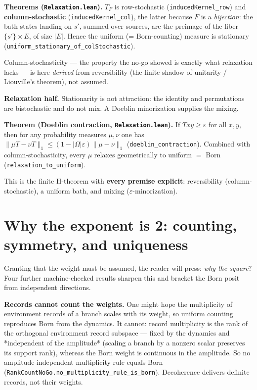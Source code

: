 \documentclass[11pt,a4paper]{article}
\newenvironment{qiqtquote}{\begin{mdframed}[style=quotestyle]}{\end{mdframed}}
\begin{document}
\begin{qiqtquote}
\textbf{Theorems (\texttt{Relaxation.lean}).} $T_F$ is row-stochastic (\texttt{inducedKernel\_row}) and \textbf{column-stochastic}
(\texttt{inducedKernel\_col}), the latter because $F$ is a \emph{bijection}: the bath states landing on $s'$, summed
over sources, are the preimage of the fiber $\{s'\}\times E$, of size $\lvert E\rvert$. Hence the uniform
(= Born-counting) measure is stationary (\texttt{uniform\_stationary\_of\_colStochastic}).
\end{qiqtquote}

Column-stochasticity — the property the no-go showed is exactly what relaxation lacks — is here \emph{derived}
from reversibility (the finite shadow of unitarity / Liouville's theorem), not assumed.

\textbf{Relaxation half.} Stationarity is not attraction: the identity and permutations are bistochastic and do
not mix. A Doeblin minorization supplies the mixing.

\begin{qiqtquote}
\textbf{Theorem (Doeblin contraction, \texttt{Relaxation.lean}).} If $T x y\ge\varepsilon$ for all $x,y$, then for any
probability measures $\mu,\nu$ one has $\lVert \mu T-\nu T\rVert_1 \le (1-\lvert\Omega\rvert\varepsilon)\lVert\mu-\nu\rVert_1$ (\texttt{doeblin\_contraction}). Combined with column-stochasticity, every $\mu$ relaxes
geometrically to uniform $=$ Born (\texttt{relaxation\_to\_uniform}).
\end{qiqtquote}

This is the finite H-theorem with \textbf{every premise explicit}: reversibility (column-stochastic), a uniform
bath, and mixing ($\varepsilon$-minorization).

\section{Why the exponent is 2: counting, symmetry, and uniqueness}

Granting that the weight must be assumed, the reader will press: \emph{why the square}? Four further
machine-checked results sharpen this and bracket the Born posit from independent directions.

\textbf{Records cannot count the weights.} One might hope the multiplicity of environment records of a branch
scales with its weight, so uniform counting reproduces Born from the dynamics. It cannot: record multiplicity
is the rank of the orthogonal environment record subspace — fixed by the dynamics and *independent of the
amplitude* (scaling a branch by a nonzero scalar preserves its support rank), whereas the Born weight is
continuous in the amplitude. So no amplitude-independent multiplicity rule equals Born
(\texttt{RankCountNoGo.no\_multiplicity\_rule\_is\_born}). Decoherence delivers definite records, not their weights.
\end{document}
